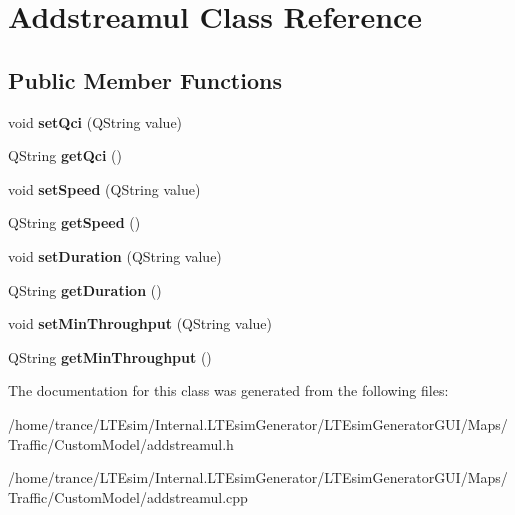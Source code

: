 \hypertarget{class_addstreamul}{}\section{Addstreamul Class Reference}
\label{class_addstreamul}
\subsection*{Public Member Functions}
\begin{DoxyCompactItemize}
\item 
void {\bfseries set\+Qci} (Q\+String value)\hypertarget{class_addstreamul_a8ac1ba6563353185e5dad1d537468536}{}\label{class_addstreamul_a8ac1ba6563353185e5dad1d537468536}

\item 
Q\+String {\bfseries get\+Qci} ()\hypertarget{class_addstreamul_aacf7152b96fd11bf9accab8c2037c0fc}{}\label{class_addstreamul_aacf7152b96fd11bf9accab8c2037c0fc}

\item 
void {\bfseries set\+Speed} (Q\+String value)\hypertarget{class_addstreamul_a2a3cc8036d59a0c5d5b8775c906968d3}{}\label{class_addstreamul_a2a3cc8036d59a0c5d5b8775c906968d3}

\item 
Q\+String {\bfseries get\+Speed} ()\hypertarget{class_addstreamul_ac45295c633f07e5ca432642e4f7dd21f}{}\label{class_addstreamul_ac45295c633f07e5ca432642e4f7dd21f}

\item 
void {\bfseries set\+Duration} (Q\+String value)\hypertarget{class_addstreamul_a6e3606c586811c962ea8d3735c1ff0af}{}\label{class_addstreamul_a6e3606c586811c962ea8d3735c1ff0af}

\item 
Q\+String {\bfseries get\+Duration} ()\hypertarget{class_addstreamul_a5bd4971f97a32b40578147758d6fbcbf}{}\label{class_addstreamul_a5bd4971f97a32b40578147758d6fbcbf}

\item 
void {\bfseries set\+Min\+Throughput} (Q\+String value)\hypertarget{class_addstreamul_a8288be0b9ac0ef0d0148253d98da173d}{}\label{class_addstreamul_a8288be0b9ac0ef0d0148253d98da173d}

\item 
Q\+String {\bfseries get\+Min\+Throughput} ()\hypertarget{class_addstreamul_ab6c7dfa9c4258b1161637108629b350e}{}\label{class_addstreamul_ab6c7dfa9c4258b1161637108629b350e}

\end{DoxyCompactItemize}


The documentation for this class was generated from the following files\+:\begin{DoxyCompactItemize}
\item 
/home/trance/\+L\+T\+Esim/\+Internal.\+L\+T\+Esim\+Generator/\+L\+T\+Esim\+Generator\+G\+U\+I/\+Maps/\+Traffic/\+Custom\+Model/addstreamul.\+h\item 
/home/trance/\+L\+T\+Esim/\+Internal.\+L\+T\+Esim\+Generator/\+L\+T\+Esim\+Generator\+G\+U\+I/\+Maps/\+Traffic/\+Custom\+Model/addstreamul.\+cpp\end{DoxyCompactItemize}

